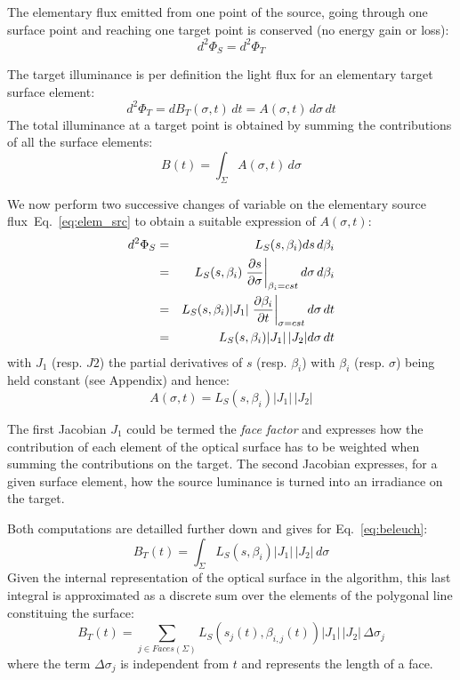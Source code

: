 The elementary flux emitted
from one point of the source, going through one surface point
and reaching one target point is conserved (no energy gain or loss):
\[  d^2\Phi_S = d^2\Phi_T \]

The target illuminance is per definition the light flux for an elementary
target surface element:
\[ d^2\Phi_T = dB_T(\sigma, t)\,dt = A(\sigma, t)\,d\sigma\,dt\] 
The total illuminance at a target point is obtained by summing the contributions
of all the surface elements:
\begin{equation}
 B(t) = \int_\Sigma A(\sigma, t)\,d\sigma
\label{eq:beleuch}
\end{equation}

We now perform two successive changes of variable on the elementary source
flux~Eq.~\eqref{eq:elem_src} to obtain a suitable expression of $A(\sigma, t)$:
\begin{eqnarray*}
d^2\Phi_S &= & L_S(s, \beta_i)ds\,d\beta_i \\
    &      = & L_S(s, \beta_i) \left. \frac{\partial{s}}{\partial{\sigma}} 
            \right|_{\beta_i=cst} d\sigma\,d\beta_i \\
    &      = & L_S(s, \beta_i)|J_1| \left. \frac{\partial{\beta_i}}{\partial{t}}
             \right|_{\sigma=cst} d\sigma\,dt \\    
    &      = & L_S(s, \beta_i)|J_1|\,|J_2| d\sigma\,dt \\    
\end{eqnarray*}
with $J_1$ (resp. $J2$) the partial derivatives of $s$ (resp. $\beta_i$) with 
$\beta_i$ (resp. $\sigma$) being held constant (see Appendix) and hence:
\[ A(\sigma, t) =  L_S(s, \beta_i)|J_1|\,|J_2|\]

The first Jacobian $J_1$ could be termed the \textit{face factor}
and expresses how the contribution of each element of the 
optical surface has to be weighted when summing the contributions on the target.
The second Jacobian expresses, for a given surface element,
how the source luminance is turned into an irradiance on the target.

Both computations are detailled further down and gives for Eq.~\eqref{eq:beleuch}:
\[ B_T(t) = \int_\Sigma L_S(s, \beta_i) |J_1| \,|J_2|\, d\sigma \]
Given the internal representation of the optical surface in the 
algorithm, this last integral is approximated as a discrete
sum over the 
elements of the polygonal line constituing the surface:
\begin{equation}
\label{eq:computed_irr}
B_T(t) = \sum_{j \in Faces(\Sigma)} L_S(s_j(t), \beta_{i, j}(t)) 
|J_1| \,|J_2|\,\Delta \sigma_j 
\end{equation} 
where the term $\Delta \sigma_j$ is independent from $t$ and represents the
length of a face.

